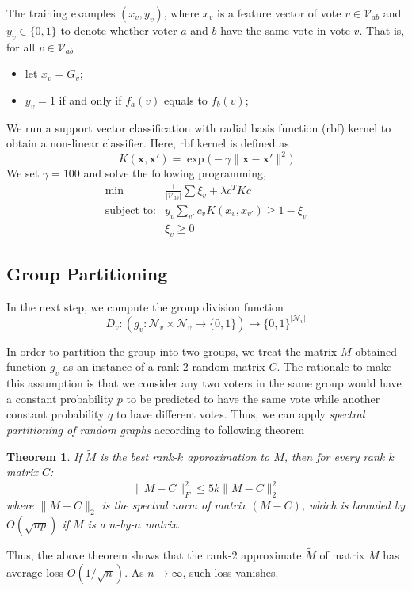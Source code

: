 \documentclass{article} %
\newtheorem{theo}{Theorem}
\begin{document}
    The training examples $(x_v, y_v)$, where $x_v$ is a feature vector of vote $v \in \mathcal V_{ab}$ and $y_v \in \{0, 1\}$ to denote whether voter $a$ and $b$ have the same vote in vote $v$. That is, for all $v \in \mathcal V_{ab}$
    \begin{itemize}
        \item let $x_v = G_v$;
        \item $y_v = 1$ if and only if $f_a(v)$ equals to $f_b(v)$;   
    \end{itemize}
    
    We run a support vector classification with radial basis function (rbf) kernel to obtain a non-linear classifier. Here, rbf kernel is defined as
    \[
        K(\mathbf x, \mathbf x') = \exp\big( -\gamma \|\mathbf x - \mathbf x'\|^2 \big)
    \]
    We set $\gamma = 100$ and solve the following programming,
    \[
        \begin{array}{rc}
            \min & \frac 1 {|\mathcal V_{ab}|} \sum \xi_v + \lambda c^T K c \\
            \mbox{subject to:} & y_v \sum_{v'} c_v K(x_v, x_{v'}) \geq 1 - \xi_v \\
                & \xi_v \geq 0
        \end{array}
    \]

\subsection{Group Partitioning}
    In the next step, we compute the group division function 
    \[
        D_v : (g_v: \mathcal N_v \times \mathcal N_v \to \{0, 1\}) \to \{0, 1\}^{|\mathcal N_v|}
    \]
    
    In order to partition the group into two groups, we treat the matrix $M$ obtained function $g_v$ as an instance of a rank-$2$ random matrix $C$. The rationale to make this assumption is that we consider any two voters in the same group would have a constant probability $p$ to be predicted to have the same vote while another constant probability $q$ to have different votes. Thus, we can apply {\em spectral partitioning of random graphs} \cite{mcsherry2001spectral} according to following theorem
    \begin{theo}
        If $\tilde M$ is the best rank-$k$ approximation to $M$, then for every rank $k$ matrix $C$:
        \[
            \|\tilde M - C\|_F^2 \leq 5 k \|M - C\|_2^2
        \]
        where $\|M - C\|_2$ is the spectral norm of matrix $(M - C)$, which is bounded by $O(\sqrt{np})$ if $M$ is a $n$-by-$n$ matrix. 
    \end{theo}
    Thus, the above theorem shows that the rank-$2$ approximate $\tilde M$ of matrix $M$ has average loss $O(1 / \sqrt n)$. As $n \to \infty$, such loss vanishes.
\end{document}
